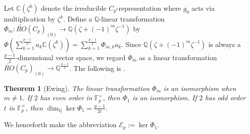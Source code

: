 \documentclass[11pt, twoside]{amsart}
\theoremstyle{plain}
\newtheorem{theorem}{Theorem}[section]
\theoremstyle{definition}
\theoremstyle{remark}
\newcommand{\R}{\mathbb R}
\newcommand{\Q}{\mathbb Q}
\newcommand{\C}{\mathbb C}
\newcommand{\F}{\mathbb F}
\newcommand{\ep}{\varepsilon}
\newcommand{\mc}[1]{\mathcal{{#1}}}
\begin{document}
Let $\C(\zeta^k)$ denote the irreducible $C_p$-representation where $g_0$ acts via multiplication by $\zeta^k$.
Define a $\Q$-linear transformation $\Phi_m:\widetilde{RO}(C_p)_{(0)}\rightarrow \Q(\zeta+(-1)^m\zeta^{-1})$ by $\Phi\left(\sum_{k=1}^{\frac{p-1}{2}}a_k\C(\zeta^k)\right)=\sum_{k=1}^{\frac{p-1}{2}}\Phi_{m,k}a_k$.
Since $\Q(\zeta+(-1)^m\zeta^{-1})$ is always a $\frac{p-1}{2}$-dimensional vector space, we regard $\Phi_m$ as a linear transformation $\widetilde{RO}(C_p)_{(0)}\to\Q^{\frac{p-1}{2}}$.
The following is \cite[Theorem 1.1]{EwingSpheresAsFPSets}.

\begin{theorem}[Ewing]\label{thm: Ewing}
The linear transformation $\Phi_m$ is an isomorphism when $m\neq1$.
If $2$ has even order in $\F_p^\times$, then $\Phi_1$ is an isomorphism.
If $2$ has odd order $t$ in $\F_p^\times$, then $\dim_{\Q}\ker\Phi_1=\frac{p-1}{2t}$.
\end{theorem}

We henceforth make the abbreviation $\mc{E}_p:=\ker\Phi_1$.




\end{document}
